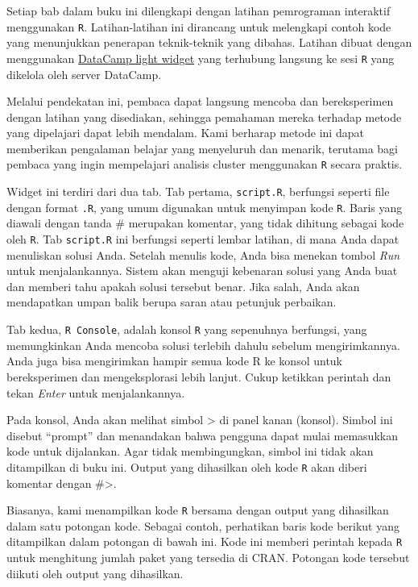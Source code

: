 \documentclass[
  oneside]{book}
\begin{document}
Setiap bab dalam buku ini dilengkapi dengan latihan pemrograman
interaktif menggunakan \texttt{R}. Latihan-latihan ini dirancang
untuk melengkapi contoh kode yang menunjukkan penerapan teknik-teknik
yang dibahas. Latihan dibuat dengan menggunakan \href{https://github.com/datacamp/datacamp-light}{DataCamp light
widget} yang terhubung
langsung ke sesi \texttt{R} yang dikelola oleh server DataCamp.

Melalui pendekatan ini, pembaca dapat langsung mencoba dan bereksperimen
dengan latihan yang disediakan, sehingga pemahaman mereka terhadap
metode yang dipelajari dapat lebih mendalam. Kami berharap metode ini
dapat memberikan pengalaman belajar yang menyeluruh dan menarik,
terutama bagi pembaca yang ingin mempelajari analisis cluster
menggunakan \texttt{R} secara praktis.

Widget ini terdiri dari dua tab. Tab pertama, \texttt{script.R},
berfungsi seperti file dengan format \texttt{.R}, yang umum
digunakan untuk menyimpan kode \texttt{R}. Baris yang diawali
dengan tanda \# merupakan komentar, yang tidak dihitung sebagai kode
oleh \texttt{R}. Tab \texttt{script.R} ini berfungsi seperti lembar
latihan, di mana Anda dapat menuliskan solusi Anda. Setelah menulis
kode, Anda bisa menekan tombol \emph{Run} untuk menjalankannya. Sistem akan
menguji kebenaran solusi yang Anda buat dan memberi tahu apakah solusi
tersebut benar. Jika salah, Anda akan mendapatkan umpan balik berupa
saran atau petunjuk perbaikan.

Tab kedua, \texttt{R Console}, adalah konsol \texttt{R} yang
sepenuhnya berfungsi, yang memungkinkan Anda mencoba solusi terlebih
dahulu sebelum mengirimkannya. Anda juga bisa mengirimkan hampir semua
kode R ke konsol untuk bereksperimen dan mengeksplorasi lebih lanjut.
Cukup ketikkan perintah dan tekan \emph{Enter} untuk menjalankannya.

Pada konsol, Anda akan melihat simbol \textgreater{} di panel kanan
(konsol). Simbol ini disebut ``prompt'' dan menandakan bahwa pengguna
dapat mulai memasukkan kode untuk dijalankan. Agar tidak membingungkan,
simbol ini tidak akan ditampilkan di buku ini. Output yang dihasilkan
oleh kode \texttt{R} akan diberi komentar dengan \#\textgreater{}.

Biasanya, kami menampilkan kode \texttt{R} bersama dengan output
yang dihasilkan dalam satu potongan kode. Sebagai contoh, perhatikan
baris kode berikut yang ditampilkan dalam potongan di bawah ini. Kode
ini memberi perintah kepada \texttt{R} untuk menghitung jumlah
paket yang tersedia di CRAN. Potongan kode tersebut diikuti oleh output
yang dihasilkan.
\end{document}

